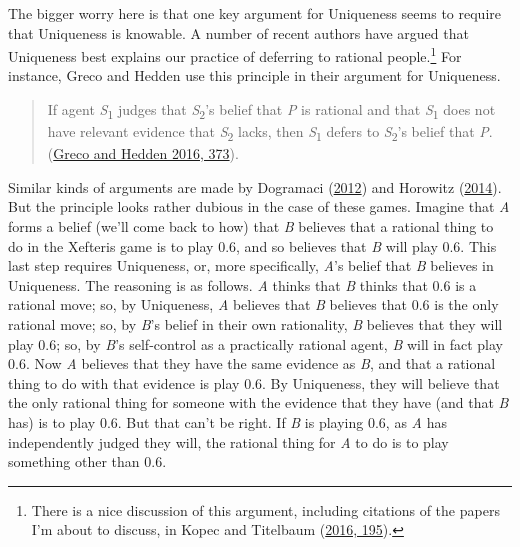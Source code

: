 \documentclass[
  12pt,
  letterpaper,
  DIV=11,
  numbers=noendperiod]{scrreprt}
\begin{document}
The bigger worry here is that one key argument for Uniqueness seems to
require that Uniqueness is knowable. A number of recent authors have
argued that Uniqueness best explains our practice of deferring to
rational people.\footnote{There is a nice discussion of this argument,
  including citations of the papers I'm about to discuss, in Kopec and
  Titelbaum (\protect\hyperlink{ref-KopecTitelbaum2016}{2016, 195}).}
For instance, Greco and Hedden use this principle in their argument for
Uniqueness.

\begin{quote}
If agent \emph{S}\textsubscript{1} judges that
\emph{S}\textsubscript{2}'s belief that \emph{P} is rational and that
\emph{S}\textsubscript{1} does not have relevant evidence that
\emph{S}\textsubscript{2} lacks, then \emph{S}\textsubscript{1} defers
to \emph{S}\textsubscript{2}'s belief that \emph{P}.
(\protect\hyperlink{ref-GrecoHedden2016}{Greco and Hedden 2016, 373}).
\end{quote}

Similar kinds of arguments are made by Dogramaci
(\protect\hyperlink{ref-Dogramaci2012}{2012}) and Horowitz
(\protect\hyperlink{ref-Horowitz2014}{2014}). But the principle looks
rather dubious in the case of these games. Imagine that \emph{A} forms a
belief (we'll come back to how) that \emph{B} believes that a rational
thing to do in the Xefteris game is to play 0.6, and so believes that
\emph{B} will play 0.6. This last step requires Uniqueness, or, more
specifically, \emph{A}'s belief that \emph{B} believes in Uniqueness.
The reasoning is as follows. \emph{A} thinks that \emph{B} thinks that
0.6 is a rational move; so, by Uniqueness, \emph{A} believes that
\emph{B} believes that 0.6 is the only rational move; so, by \emph{B}'s
belief in their own rationality, \emph{B} believes that they will play
0.6; so, by \emph{B}'s self-control as a practically rational agent,
\emph{B} will in fact play 0.6. Now \emph{A} believes that they have the
same evidence as \emph{B}, and that a rational thing to do with that
evidence is play 0.6. By Uniqueness, they will believe that the only
rational thing for someone with the evidence that they have (and that
\emph{B} has) is to play 0.6. But that can't be right. If \emph{B} is
playing 0.6, as \emph{A} has independently judged they will, the
rational thing for \emph{A} to do is to play something other than 0.6.
\end{document}

